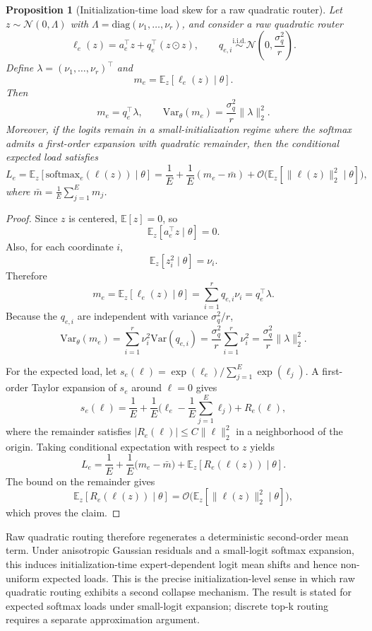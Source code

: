 \documentclass[11pt]{article}
\newtheorem{proposition}{Proposition}
\begin{document}
\begin{proposition}[Initialization-time load skew for a raw quadratic router]
Let $z\sim \mathcal N(0,\Lambda)$ with $\Lambda=\mathrm{diag}(\nu_1,\dots,\nu_r)$, and consider a raw quadratic router
\[
\ell_e(z)=a_e^\top z + q_e^\top (z\odot z),
\qquad
q_{e,i}\overset{\mathrm{i.i.d.}}{\sim}\mathcal N\!\left(0,\frac{\sigma_q^2}{r}\right).
\]
Define $\lambda=(\nu_1,\dots,\nu_r)^\top$ and
\[
m_e=\mathbb E_z[\ell_e(z)\mid \theta].
\]
Then
\[
m_e=q_e^\top \lambda,
\qquad
\mathrm{Var}_\theta(m_e)=\frac{\sigma_q^2}{r}\|\lambda\|_2^2.
\]
Moreover, if the logits remain in a small-initialization regime where the softmax admits a first-order expansion with quadratic remainder, then the conditional expected load satisfies
\[
L_e
=
\mathbb E_z[\mathrm{softmax}_e(\ell(z))\mid\theta]
=
\frac1E+\frac1E(m_e-\bar m)+\mathcal O\!\big(\mathbb E_z[\|\ell(z)\|_2^2\mid\theta]\big),
\]
where $\bar m=\frac1E\sum_{j=1}^E m_j$.
\end{proposition}

\begin{proof}
Since $z$ is centered, $\mathbb E[z]=0$, so
\[
\mathbb E_z[a_e^\top z\mid\theta]=0.
\]
Also, for each coordinate $i$,
\[
\mathbb E_z[z_i^2\mid\theta]=\nu_i.
\]
Therefore
\[
m_e
=
\mathbb E_z[\ell_e(z)\mid\theta]
=
\sum_{i=1}^r q_{e,i}\nu_i
=
q_e^\top \lambda.
\]
Because the $q_{e,i}$ are independent with variance $\sigma_q^2/r$,
\[
\mathrm{Var}_\theta(m_e)
=
\sum_{i=1}^r \nu_i^2 \mathrm{Var}(q_{e,i})
=
\frac{\sigma_q^2}{r}\sum_{i=1}^r \nu_i^2
=
\frac{\sigma_q^2}{r}\|\lambda\|_2^2.
\]

For the expected load, let $s_e(\ell)=\exp(\ell_e)/\sum_{j=1}^E \exp(\ell_j)$. A first-order Taylor expansion of $s_e$ around $\ell=0$ gives
\[
s_e(\ell)
=
\frac1E + \frac1E\Big(\ell_e-\frac1E\sum_{j=1}^E \ell_j\Big) + R_e(\ell),
\]
where the remainder satisfies $|R_e(\ell)|\le C\|\ell\|_2^2$ in a neighborhood of the origin. Taking conditional expectation with respect to $z$ yields
\[
L_e
=
\frac1E+\frac1E\Big(m_e-\bar m\Big)+\mathbb E_z[R_e(\ell(z))\mid\theta].
\]
The bound on the remainder gives
\[
\mathbb E_z[R_e(\ell(z))\mid\theta]
=
\mathcal O\!\big(\mathbb E_z[\|\ell(z)\|_2^2\mid\theta]\big),
\]
which proves the claim.
\end{proof}

Raw quadratic routing therefore regenerates a deterministic second-order mean term. Under anisotropic Gaussian residuals and a small-logit softmax expansion, this induces initialization-time expert-dependent logit mean shifts and hence non-uniform expected loads. This is the precise initialization-level sense in which raw quadratic routing exhibits a second collapse mechanism. The result is stated for expected softmax loads under small-logit expansion; discrete top-k routing requires a separate approximation argument.
\end{document}
